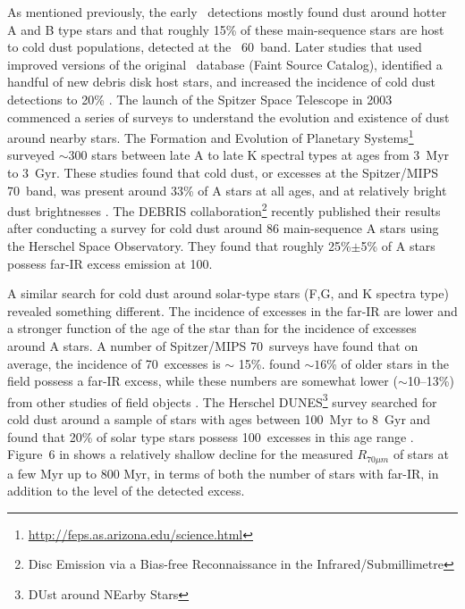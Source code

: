    As mentioned previously, the early \iras\ detections mostly found dust around hotter A and B type stars and that roughly 15\% of these main-sequence stars are host to cold dust populations, detected at the \iras\ 60\micron\ band. Later studies that used improved versions of the original \iras\ database (Faint Source Catalog), identified a handful of new debris disk host stars, and increased the incidence of cold dust detections to 20\% \citep{Rhee2007}. The launch of the Spitzer Space Telescope in 2003 commenced a series of surveys to understand the evolution and existence of dust around nearby stars. The Formation and Evolution of Planetary Systems\footnote{\url{http://feps.as.arizona.edu/science.html}} \citep[FEPS;][]{Meyer2006} surveyed $\sim$300 stars between late A to late K spectral types at ages from 3~Myr to 3~Gyr. These studies found that cold dust, or excesses at the Spitzer/MIPS 70\micron\ band, was present around 33\% of A stars at all ages, and at relatively bright dust brightnesses \citep{Su2006}. The DEBRIS collaboration\footnote{Disc Emission via a Bias-free Reconnaissance in the Infrared/Submillimetre} recently published their results after conducting a survey for cold dust around 86 main-sequence A stars using the Herschel Space Observatory. They found that roughly 25\%$\pm$5\% of A stars possess far-IR excess emission at 100\micron \citep{Thureau2014}. 
   
   
   A similar search for cold dust around solar-type stars (F,G, and K spectra type) revealed something different. The incidence of excesses in the far-IR are lower and a stronger function of the age of the star than for the incidence of excesses around A stars. A number of Spitzer/MIPS 70\micron\ surveys \citep[e.g.,][]{Trilling2008, Bryden2006, Beichman2006, Hillenbrand2008} have found that on average, the incidence of 70\micron\ excesses is $\sim$ 15\%. \citet{Trilling2008} found $\sim16$\% of older stars in the field possess a far-IR excess, while these numbers are somewhat lower ($\sim$10--13\%) from other studies of field objects \citep{Beichman2006, Bryden2006}. The Herschel DUNES\footnote{DUst around NEarby Stars} survey searched for cold dust around a sample of stars with ages between 100~Myr to 8~Gyr and found that 20\% of solar type stars possess 100\micron\ excesses in this age range \citep{Eiroa2013}. Figure~6 in \citet{Wyatt2008} shows a relatively shallow decline for the measured $R_{70\mu m}$ of stars at a few Myr up to 800 Myr, in terms of both the number of stars with far-IR, in addition to the level of the detected excess. 
   
